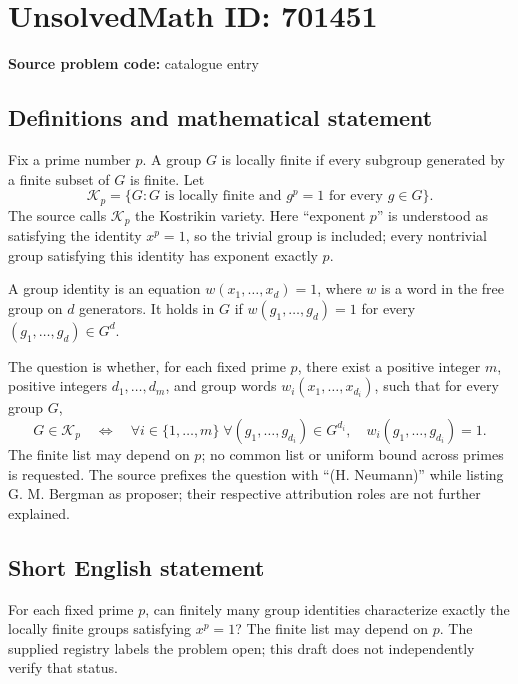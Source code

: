 \documentclass[11pt]{article}
\begin{document}
\section*{UnsolvedMath ID: 701451}
\textbf{Source problem code:} catalogue entry
\subsection{Definitions and mathematical statement}
Fix a prime number \(p\). A group \(G\) is locally finite if every subgroup generated by a finite subset of \(G\) is finite. Let
\[
\mathcal K_p=\{G: G\text{ is locally finite and }g^p=1\text{ for every }g\in G\}.
\]
The source calls \(\mathcal K_p\) the Kostrikin variety. Here ``exponent \(p\)'' is understood as satisfying the identity \(x^p=1\), so the trivial group is included; every nontrivial group satisfying this identity has exponent exactly \(p\).

A group identity is an equation \(w(x_1,\ldots,x_d)=1\), where \(w\) is a word in the free group on \(d\) generators. It holds in \(G\) if \(w(g_1,\ldots,g_d)=1\) for every \((g_1,\ldots,g_d)\in G^d\).

The question is whether, for each fixed prime \(p\), there exist a positive integer \(m\), positive integers \(d_1,\ldots,d_m\), and group words \(w_i(x_1,\ldots,x_{d_i})\), such that for every group \(G\),
\[
G\in\mathcal K_p
\quad\Longleftrightarrow\quad
\forall i\in\{1,\ldots,m\}\;\forall(g_1,\ldots,g_{d_i})\in G^{d_i},\quad w_i(g_1,\ldots,g_{d_i})=1.
\]
The finite list may depend on \(p\); no common list or uniform bound across primes is requested. The source prefixes the question with ``(H. Neumann)'' while listing G. M. Bergman as proposer; their respective attribution roles are not further explained.
\subsection{Short English statement}
For each fixed prime \(p\), can finitely many group identities characterize exactly the locally finite groups satisfying \(x^p=1\)? The finite list may depend on \(p\). The supplied registry labels the problem open; this draft does not independently verify that status.
\end{document}
